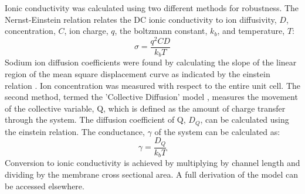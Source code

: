 Ionic conductivity was calculated using two different methods for
robustness. The Nernst-Einstein relation relates 
the DC ionic conductivity to ion diffusivity, $D$, concentration,
$C$, ion charge, $q$, the boltzmann constant, $k_b$, and temperature,
$T$: $$\sigma = \dfrac{q^2CD}{k_b T}$$ Sodium ion diffusion 
coefficients were found by calculating the slope of the linear
region of the mean square displacement curve as indicated by the einstein relation
\cite{einstein_investigations_1956}. Ion concentration was measured with
respect to the entire unit cell. The second method, termed the 'Collective
Diffusion' model \cite{liu_collective_2013}, measures the movement of
the collective variable, Q, which is defined as the amount of charge 
transfer through the system. The diffusion coefficient of Q, $D_Q$, can
be calculated using the einstein relation. The conductance, $\gamma$ of
the system can be calculated as: $$ \gamma = \dfrac{D_Q}{k_b T} $$ 
Conversion to ionic conductivity is achieved by multiplying by channel 
length and dividing by the membrane cross sectional area. A full 
derivation of the model can be accessed elsewhere\cite{liu_collective_2013}.  
